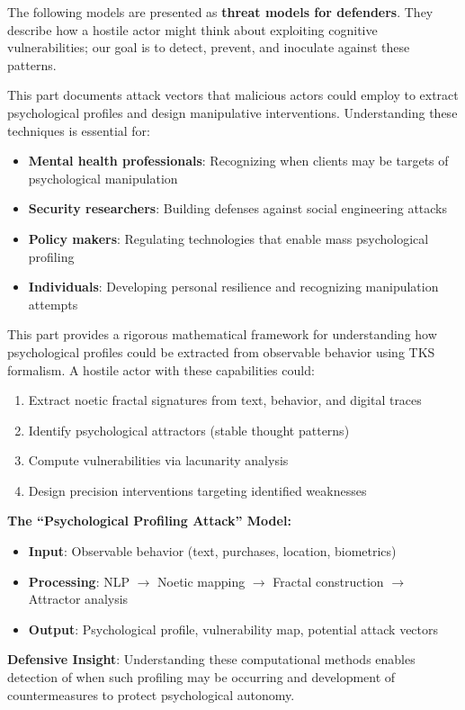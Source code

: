 \documentclass[11pt,twoside]{book}
\theoremstyle{definition}
\theoremstyle{plain}
\theoremstyle{remark}
\begin{document}
\begin{tcolorbox}[colback=red!5!white,colframe=red!75!black,title=\textbf{THREAT MODEL NOTICE},breakable]
The following models are presented as \textbf{threat models for defenders}. They describe how a hostile actor might think about exploiting cognitive vulnerabilities; our goal is to detect, prevent, and inoculate against these patterns.

This part documents attack vectors that malicious actors could employ to extract psychological profiles and design manipulative interventions. Understanding these techniques is essential for:
\begin{itemize}
    \item \textbf{Mental health professionals}: Recognizing when clients may be targets of psychological manipulation
    \item \textbf{Security researchers}: Building defenses against social engineering attacks
    \item \textbf{Policy makers}: Regulating technologies that enable mass psychological profiling
    \item \textbf{Individuals}: Developing personal resilience and recognizing manipulation attempts
\end{itemize}
\end{tcolorbox}

\begin{tcolorbox}[colback=blue!5!white,colframe=blue!75!black,title=\textbf{Part Overview},breakable]
This part provides a rigorous mathematical framework for understanding how psychological profiles could be extracted from observable behavior using TKS formalism. A hostile actor with these capabilities could:
\begin{enumerate}
    \item Extract noetic fractal signatures from text, behavior, and digital traces
    \item Identify psychological attractors (stable thought patterns)
    \item Compute vulnerabilities via lacunarity analysis
    \item Design precision interventions targeting identified weaknesses
\end{enumerate}

\textbf{The ``Psychological Profiling Attack'' Model:}
\begin{itemize}
    \item \textbf{Input}: Observable behavior (text, purchases, location, biometrics)
    \item \textbf{Processing}: NLP $\to$ Noetic mapping $\to$ Fractal construction $\to$ Attractor analysis
    \item \textbf{Output}: Psychological profile, vulnerability map, potential attack vectors
\end{itemize}

\textbf{Defensive Insight}: Understanding these computational methods enables detection of when such profiling may be occurring and development of countermeasures to protect psychological autonomy.
\end{tcolorbox}
\end{document}
